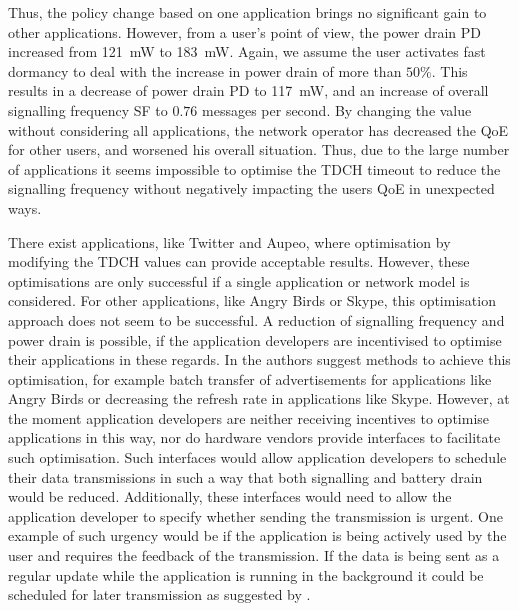 Thus, the policy change based on one application brings no significant gain to other applications.
However, from a user's point of view, the power drain \gls{PD} increased from \SI{121}{\milli\watt} to \SI{183}{\milli\watt}.
Again, we assume the user activates fast dormancy to deal with the increase in power drain of more than $50\%$.
This results in a decrease of power drain \gls{PD} to \SI{117}{\milli\watt}, and an increase of overall signalling frequency \gls{SF} to \(0.76\) messages per second.
By changing the value without considering all applications, the network operator has decreased the \gls{QoE} for other users, and worsened his overall situation.
Thus, due to the large number of applications it seems impossible to optimise the \gls{TDCH} timeout to reduce the signalling frequency without negatively impacting the users \gls{QoE} in unexpected ways.

There exist applications, like Twitter and Aupeo, where optimisation by modifying the \gls{TDCH} values can provide acceptable results.
However, these optimisations are only successful if a single application or network model is considered.
For other applications, like Angry Birds or Skype, this optimisation approach does not seem to be successful.
A reduction of signalling frequency and power drain is possible, if the application developers are incentivised to optimise their applications in these regards.
In \cite{Qian2011} the authors suggest methods to achieve this optimisation, for example batch transfer of advertisements for applications like Angry Birds or decreasing the refresh rate in applications like Skype.
However, at the moment application developers are neither receiving incentives to optimise applications in this way, nor do hardware vendors provide interfaces to facilitate such optimisation.
Such interfaces would allow application developers to schedule their data transmissions in such a way that both signalling and battery drain would be reduced.
Additionally, these interfaces would need to allow the application developer to specify whether sending the transmission is urgent.
One example of such urgency would be if the application is being actively used by the user and requires the feedback of the transmission.
If the data is being sent as a regular update while the application is running in the background it could be scheduled for later transmission as suggested by \cite{Calder2010, Vergara2012}.

